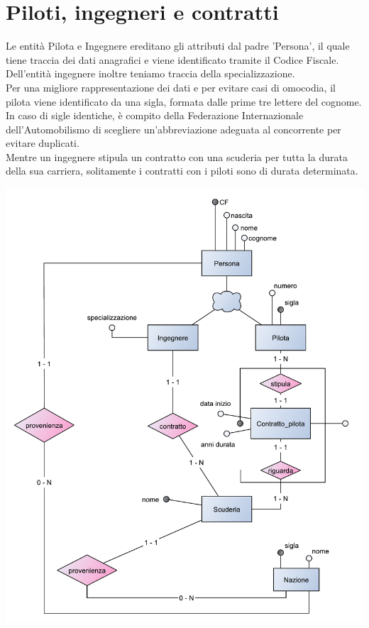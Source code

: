 \documentclass[a4paper,12pt]{report}
\begin{document}
		\section{Piloti, ingegneri e contratti}
			{\fontsize{12.5}{20}\selectfont
			Le entità Pilota e Ingegnere ereditano gli attributi dal padre 'Persona', il quale tiene traccia dei
			dati anagrafici e viene identificato tramite il Codice Fiscale.\\
			Dell'entità ingegnere inoltre teniamo traccia della specializzazione.\\
			Per una migliore rappresentazione dei dati e per evitare casi di omocodia, il pilota viene identificato
			da una sigla, formata dalle prime tre lettere del cognome. In caso di sigle identiche, è compito della
			Federazione Internazionale dell'Automobilismo di scegliere un'abbreviazione adeguata al concorrente
			per evitare duplicati.\\
			Mentre un ingegnere stipula un contratto con una scuderia per tutta la durata della sua carriera,
			solitamente i contratti con i piloti sono di durata determinata.}
			\begin{center}
			\hspace*{-2cm}%
			\includegraphics[width=\dimexpr\textwidth+4cm\relax]{copies/scheletro1.pdf}%
			\hspace*{-2cm}%
			\end{center}
		\pagebreak
\end{document}

